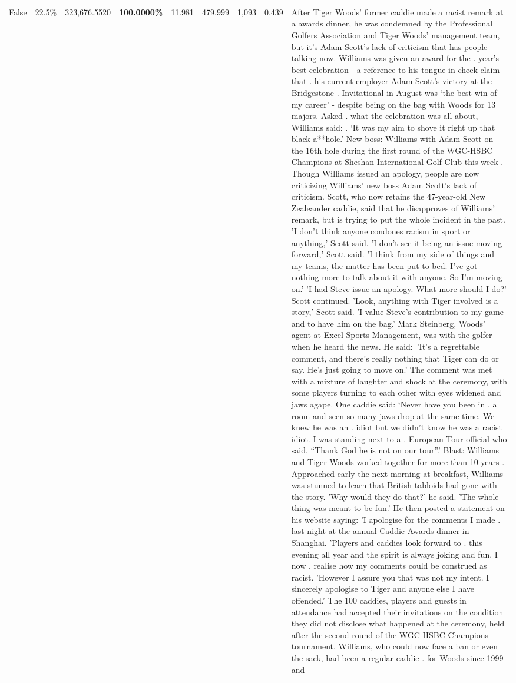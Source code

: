 \begin{table}[H]
\begin{tabular}{lllrlllll}
False & 22.5\% & 323,676.5520 & \bfseries \color{red} 100.0000\% & 11.981 & 479.999 & 1,093 & 0.439 & After Tiger Woods' former caddie made a racist remark at a awards dinner, he was condemned by the Professional Golfers Association and Tiger Woods' management team, but it's Adam Scott's lack of criticism that has people talking now. Williams was given an award for the . year’s best celebration - a reference to his tongue-in-cheek claim that . his current employer Adam Scott’s victory at the Bridgestone . Invitational in August was ‘the best win of my career’ - despite being on the bag with Woods for 13 majors. Asked . what the celebration was all about, Williams said: . ‘It was my aim to shove it right up that black a**hole.’ New boss: Williams with Adam Scott  on the 16th hole during the first round of the WGC-HSBC Champions at Sheshan International Golf Club this week . Though Williams issued an apology, people are now criticizing Williams' new boss Adam Scott's lack of criticism. Scott, who now retains the 47-year-old New Zealeander caddie, said that he disapproves of Williams' remark, but is trying to put the whole incident in the past. 'I don't think anyone condones racism in sport or anything,' Scott said. 'I don't see it being an issue moving forward,' Scott said. 'I think from my side of things and my teams, the matter has been put to bed. I've got nothing more to talk about it with anyone. So I'm moving on.' 'I had Steve issue an apology. What more should I do?' Scott continued. 'Look, anything with Tiger involved is a story,' Scott said. 'I value Steve's contribution to my game and to have him on the bag.' Mark Steinberg, Woods' agent at Excel Sports Management, was with the golfer when he heard the news. He said: 'It's a regrettable comment, and there's really nothing that Tiger can do or say. He's just going to move on.' The comment was met with a mixture of laughter and shock at the ceremony, with some players turning to each other with eyes widened and jaws agape. One caddie said: ‘Never have you been in . a room and seen so many jaws drop at the same time. We knew he was an . idiot but we didn’t know he was a racist idiot. I was standing next to a . European Tour official who said, “Thank God he is not on our tour”.’ Blast: Williams and Tiger Woods worked together for more than 10 years . Approached early the next morning at breakfast, Williams was stunned to learn that British tabloids had gone with the story. 'Why would they do that?' he said. 'The whole thing was meant to be fun.' He then posted a statement on his website saying: 'I apologise for the comments I made . last night at the annual Caddie Awards dinner in Shanghai. 'Players and caddies look forward to . this evening all year and the spirit is always joking and fun. I now . realise how my comments could be construed as racist. 'However I assure you that was not my intent. I sincerely apologise to Tiger and anyone else I have offended.' The 100 caddies, players and guests in attendance had accepted their invitations on the condition they did not disclose what happened at the ceremony, held after the second round of the WGC-HSBC Champions tournament. Williams, who could now face a ban or even the sack, had been a regular caddie . for Woods since 1999 and 
\end{tabular}
\end{table}
